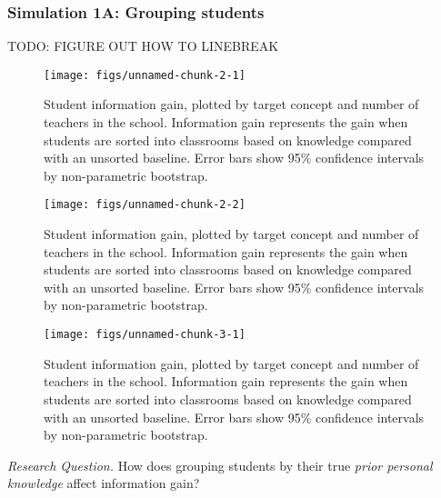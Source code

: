 \documentclass[10pt, letterpaper]{apa6}
\newenvironment{CodeChunk}{}{}
\begin{document}
\subsubsection{Simulation 1A: Grouping
students}\label{simulation-1a-grouping-students}

TODO: FIGURE OUT HOW TO LINEBREAK

\begin{CodeChunk}
\begin{figure}[t]
\texttt{[image: figs/unnamed-chunk-2-1]} \caption[Student information gain, plotted by target concept and number of teachers in the school]{Student information gain, plotted by target concept and number of teachers in the school. Information gain represents the gain when students are sorted into classrooms based on knowledge compared with an unsorted baseline. Error bars show 95\% confidence intervals by non-parametric bootstrap.}\label{fig:unnamed-chunk-21}
\end{figure}
\begin{figure}[t]
\texttt{[image: figs/unnamed-chunk-2-2]} \caption[Student information gain, plotted by target concept and number of teachers in the school]{Student information gain, plotted by target concept and number of teachers in the school. Information gain represents the gain when students are sorted into classrooms based on knowledge compared with an unsorted baseline. Error bars show 95\% confidence intervals by non-parametric bootstrap.}\label{fig:unnamed-chunk-22}
\end{figure}
\end{CodeChunk}

\begin{CodeChunk}
\begin{figure}[t]
\texttt{[image: figs/unnamed-chunk-3-1]} \caption[Student information gain, plotted by target concept and number of teachers in the school]{Student information gain, plotted by target concept and number of teachers in the school. Information gain represents the gain when students are sorted into classrooms based on knowledge compared with an unsorted baseline. Error bars show 95\% confidence intervals by non-parametric bootstrap.}\label{fig:unnamed-chunk-3}
\end{figure}
\end{CodeChunk}

\emph{Research Question. } How does grouping students by their true
\emph{prior personal knowledge} affect information gain?
\end{document}
